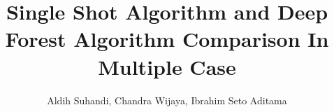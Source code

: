 \documentclass[11pt]{article}
\title{Single Shot Algorithm and Deep Forest Algorithm Comparison In Multiple Case}
\author{Aldih Suhandi, Chandra Wijaya, Ibrahim Seto Aditama}
\date{}
\begin{document}
\maketitle

\begin{abstract}
\end{abstract}
    
\end{document}
